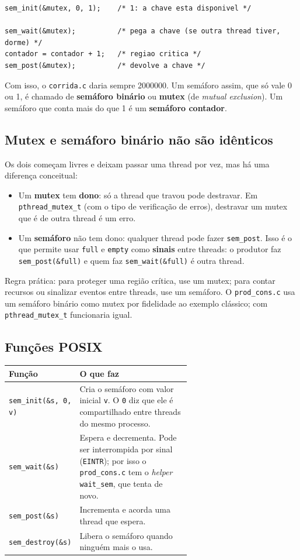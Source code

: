 \documentclass[11pt,a4paper]{article}
\newcommand{\cmd}[1]{\texttt{#1}}
\begin{document}
\begin{lstlisting}[style=codigo]
sem_init(&mutex, 0, 1);    /* 1: a chave esta disponivel */

sem_wait(&mutex);          /* pega a chave (se outra thread tiver, dorme) */
contador = contador + 1;   /* regiao critica */
sem_post(&mutex);          /* devolve a chave */
\end{lstlisting}

Com isso, o \cmd{corrida.c} daria sempre 2000000. Um semáforo assim, que só vale 0 ou 1, é chamado de \textbf{semáforo binário} ou \textbf{mutex} (de \emph{mutual exclusion}). Um semáforo que conta mais do que 1 é um \textbf{semáforo contador}.

\subsection{Mutex e semáforo binário não são idênticos}

Os dois começam livres e deixam passar uma thread por vez, mas há uma diferença conceitual:

\begin{itemize}
    \item Um \textbf{mutex} tem \textbf{dono}: só a thread que travou pode destravar. Em \cmd{pthread\_mutex\_t} (com o tipo de verificação de erros), destravar um mutex que é de outra thread é um erro.
    \item Um \textbf{semáforo} não tem dono: qualquer thread pode fazer \cmd{sem\_post}. Isso é o que permite usar \cmd{full} e \cmd{empty} como \textbf{sinais} entre threads: o produtor faz \cmd{sem\_post(\&full)} e quem faz \cmd{sem\_wait(\&full)} é outra thread.
\end{itemize}

Regra prática: para proteger uma região crítica, use um mutex; para contar recursos ou sinalizar eventos entre threads, use um semáforo. O \cmd{prod\_cons.c} usa um semáforo binário como mutex por fidelidade ao exemplo clássico; com \cmd{pthread\_mutex\_t} funcionaria igual.

\subsection{Funções POSIX}

\begin{center}
\begin{tabular}{@{}lR{0.62\linewidth}@{}}
\toprule
\textbf{Função} & \textbf{O que faz} \\
\midrule
\cmd{sem\_init(\&s, 0, v)} & Cria o semáforo com valor inicial \cmd{v}. O \cmd{0} diz que ele é compartilhado entre threads do mesmo processo. \\
\cmd{sem\_wait(\&s)} & Espera e decrementa. Pode ser interrompida por sinal (\cmd{EINTR}); por isso o \cmd{prod\_cons.c} tem o \emph{helper} \cmd{wait\_sem}, que tenta de novo. \\
\cmd{sem\_post(\&s)} & Incrementa e acorda uma thread que espera. \\
\cmd{sem\_destroy(\&s)} & Libera o semáforo quando ninguém mais o usa. \\
\bottomrule
\end{tabular}
\end{center}
\end{document}

